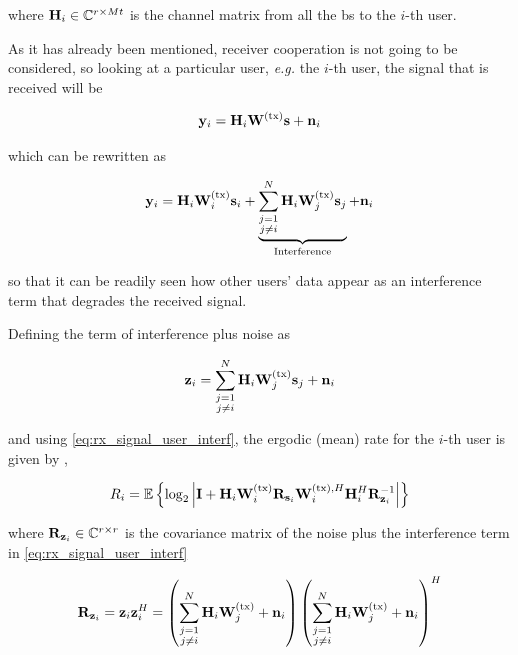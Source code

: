 \noindent
where $\mathbf{H}_i \in \mathbb{C}^{r \times Mt}$ is the channel matrix from all the \gls{bs}
to the $i$-th user.

As it has already been mentioned, receiver cooperation is not going to be
considered, so looking at a particular user, \emph{e.g.} the $i$-th user, the
signal that is received will be

\begin{equation} \label{eq:rx_signal_user}
    \mathbf{y}_i = \mathbf{H}_i \mathbf{W}^{(\text{tx})} \mathbf{s} + \mathbf{n}_i
\end{equation}

\noindent
which can be rewritten as

\begin{equation} \label{eq:rx_signal_user_interf}
    \mathbf{y}_i = \mathbf{H}_i \mathbf{W}^{(\text{tx})}_i \mathbf{s}_i +
    \underbrace{\sum\limits_{\substack{j = 1\\j \neq i}}^{N} \mathbf{H}_i
        \mathbf{W}^{(\text{tx})}_j \mathbf{s}_j}_{\text{Interference}} + \mathbf{n}_i
\end{equation}

\noindent
so that it can be readily seen how other users' data appear as an interference
term that degrades the received signal.

Defining the term of interference plus noise as

\begin{equation} \label{eq:interf_plus_noise}
    \mathbf{z}_i = \sum\limits_{\substack{j = 1\\j \neq i}}^{N} \mathbf{H}_i \mathbf{W}^{(\text{tx})}_j
    \mathbf{s}_j + \mathbf{n}_i
\end{equation}

and using \eqref{eq:rx_signal_user_interf}, the ergodic (mean) rate for the
$i$-th user is given by \cite{cover_thomas}, \cite{holter01}

\begin{equation} \label{eq:generic_ergodic_capacity}
    R_i = \mathbb{E}\left\{
        \log_2\left| \mathbf{I} + \mathbf{H}_i\mathbf{W}^{(\text{tx})}_i\mathbf{R}_{\mathbf{s}_i}\mathbf{W}^{(\text{tx}),H}_i\mathbf{H}_i^H \mathbf{R}_{\mathbf{z}_i}^{-1}
    \right|
    \right\}
\end{equation}

\noindent
where $\mathbf{R}_{\mathbf{z}_i} \in \mathbb{C}^{r \times r}$ is the covariance matrix of the noise plus
the interference term in \eqref{eq:rx_signal_user_interf}

\begin{equation} \label{eq:r_in}
    \mathbf{R}_{\mathbf{z}_i} = \mathbf{z}_i \mathbf{z}_i^H = 
    \left(\sum\limits_{\substack{j=1\\j\neq i}}^{N} \mathbf{H}_i\mathbf{W}^{(\text{tx})}_j+\mathbf{n}_i
    \right)
    \left(\sum\limits_{\substack{j=1\\j\neq i}}^{N} \mathbf{H}_i\mathbf{W}^{(\text{tx})}_j+\mathbf{n}_i
    \right)^H
\end{equation}

